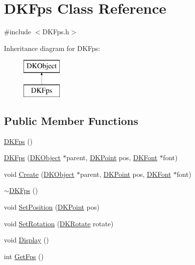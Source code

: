 \hypertarget{class_d_k_fps}{\section{D\-K\-Fps Class Reference}
\label{class_d_k_fps}
}


{\ttfamily \#include $<$D\-K\-Fps.\-h$>$}

Inheritance diagram for D\-K\-Fps\-:\begin{figure}[H]
\begin{center}
\leavevmode
\includegraphics[height=2.000000cm]{class_d_k_fps}
\end{center}
\end{figure}
\subsection*{Public Member Functions}
\begin{DoxyCompactItemize}
\item 
\hyperlink{class_d_k_fps_a25e6716ddaee46f7b19c5702765dd467}{D\-K\-Fps} ()
\item 
\hyperlink{class_d_k_fps_a43736e55b6a32e9a21244c8bde422da9}{D\-K\-Fps} (\hyperlink{class_d_k_object}{D\-K\-Object} $\ast$parent, \hyperlink{_d_k_axis_8h_a0ca1f005fbb936f8e7a7f2433591f418}{D\-K\-Point} pos, \hyperlink{class_d_k_font}{D\-K\-Font} $\ast$font)
\item 
void \hyperlink{class_d_k_fps_a659628a5e0123b98d8969356326d99f7}{Create} (\hyperlink{class_d_k_object}{D\-K\-Object} $\ast$parent, \hyperlink{_d_k_axis_8h_a0ca1f005fbb936f8e7a7f2433591f418}{D\-K\-Point} pos, \hyperlink{class_d_k_font}{D\-K\-Font} $\ast$font)
\item 
\hyperlink{class_d_k_fps_a875712b9aae6839755335c898b6ece3b}{$\sim$\-D\-K\-Fps} ()
\item 
void \hyperlink{class_d_k_fps_aba5ffdb3548dc1220c244358ebf7477c}{Set\-Position} (\hyperlink{_d_k_axis_8h_a0ca1f005fbb936f8e7a7f2433591f418}{D\-K\-Point} pos)
\item 
void \hyperlink{class_d_k_fps_ae7da5329a93f61bba1bdade409d3217a}{Set\-Rotation} (\hyperlink{_d_k_axis_8h_a886498401ce03ee3a95cb58785ab475a}{D\-K\-Rotate} rotate)
\item 
void \hyperlink{class_d_k_fps_a58ecbca0801acbc9c35f0c009ee1e884}{Display} ()
\item 
int \hyperlink{class_d_k_fps_aa9de128d48e4c03132fd5fefd38046fa}{Get\-Fps} ()
\end{DoxyCompactItemize}
